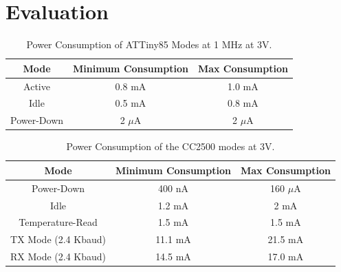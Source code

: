 \section{Evaluation}
\label{section:evaluation}

%
%
\begin{table}%
  \begin{center}
  
  \begin{tabular}{| c | c | c |}

  \hline
  \textbf{Mode} & \textbf{Minimum Consumption} & \textbf{Max Consumption} \\
  \hline
  Active      & 0.8 mA & 1.0 mA \\
  Idle        & 0.5 mA & 0.8 mA \\
  Power-Down  & 2 $\mu$A & 2 $\mu$A \\
  \hline
  
  \end{tabular}
  \end{center}
  \caption{Power Consumption of ATTiny85 Modes at 1 MHz at 3V.
  \label{table:attiny85_power}  
  }
\end{table}

%
%
\begin{table}%
  \begin{center}

  \caption{Power Consumption of the CC2500 modes at 3V.
  \label{table:cc2500_power}  
  }
  
  \begin{tabular}{| c | c | c |}

  \hline
  \textbf{Mode} & \textbf{Minimum Consumption} & \textbf{Max Consumption} \\
  \hline
  Power-Down        & 400 nA & 160 $\mu$A \\
  Idle              & 1.2 mA & 2 mA \\
  Temperature-Read  & 1.5 mA & 1.5 mA \\
  TX Mode (2.4 Kbaud) & 11.1 mA & 21.5 mA \\
  RX Mode (2.4 Kbaud) & 14.5 mA & 17.0 mA \\
  \hline
  
  \end{tabular}  
  \end{center}

\end{table}

